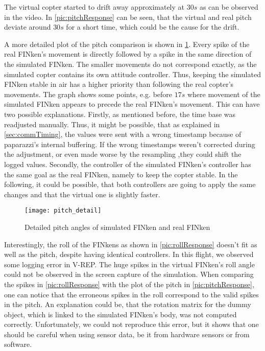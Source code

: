 The virtual copter started to drift away approximately at $30s$ as can be observed in the video.
In \ref{pic:pitchResponse} can be seen, that the virtual and real pitch deviate around $30s$ for a short time, which could be the cause for the drift.

A more detailed plot of the pitch comparison is shown in \ref{pic:pitchDetail}.
Every spike of the real FINken's movement is directly followed by a spike in the same direction of the simulated FINken.
The smaller movements do not correspond exactly, as the simulated copter contains its own attitude controller.
Thus, keeping the simulated FINken stable in air has a higher priority than following the real copter's movements.
The graph shows some points, e.g. before $17s$ where movement of the simulated FINken appears to precede the real FINken's movement.
This can have two possible explanations.
Firstly, as mentioned before, the time base was readjusted manually.
Thus, it might be possible, that as explained in \ref{sec:commTiming}, the values were sent with a wrong timestamp because of paparazzi's internal buffering.
If the wrong timestamps weren't corrected during the adjustment, or even made worse by the resampling ,they could shift the logged values.
Secondly,  the controller of the simulated FINken's controller has the same goal as the real FINken, namely to keep the copter stable. 
In the following, it could be possible, that both controllers are going to apply the same changes and that the virtual one is slightly faster.
 

\begin{figure}
	\begin{center}
	\texttt{[image: pitch\_detail]}
	\caption{Detailed pitch angles of simulated FINken and real FINken}
	\label{pic:pitchDetail}
	\end{center}
\end{figure}

Interestingly, the roll of the FINkens as shown in \ref{pic:rollResponse} doesn't fit as well as the pitch, despite having identical controllers.
In this flight, we observed some logging error in V-REP. 
The huge spikes in the virtual FINken's roll angle could not be observed in the screen capture of the simulation.
When comparing the spikes in \ref{pic:rollResponse} with the plot of the pitch in \ref{pic:pitchResponse}, one can notice that the erroneous spikes in the roll correspond to the valid spikes in the pitch.
An explanation could be, that the rotation matrix for the dummy object, which is linked to the simulated FINken's body, was not computed correctly.
Unfortunately, we could not reproduce this error, but it shows that one should be careful when using sensor data, be it from hardware sensors or from software.

